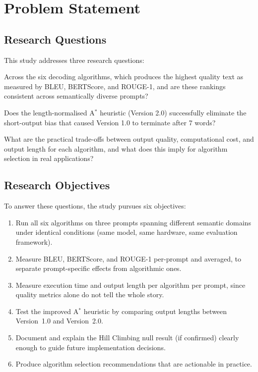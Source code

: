 \documentclass[12pt]{article}
\begin{document}
	\section{Problem Statement}
	\label{sec:problem}
	
	\subsection{Research Questions}
	
	This study addresses three research questions:
	
	\begin{description}[leftmargin=2cm, labelwidth=1.8cm]
		\item[RQ1] Across the six decoding algorithms, which produces the highest quality text as measured by BLEU, BERTScore, and ROUGE-1, and are these rankings consistent across semantically diverse prompts?
		
		\item[RQ2] Does the length-normalised A$^*$ heuristic (Version 2.0) successfully eliminate the short-output bias that caused Version 1.0 to terminate after 7 words?
		
		\item[RQ3] What are the practical trade-offs between output quality, computational cost, and output length for each algorithm, and what does this imply for algorithm selection in real applications?
	\end{description}
	
	\subsection{Research Objectives}
	
	To answer these questions, the study pursues six objectives:
	
	\begin{enumerate}[leftmargin=*]
		\item Run all six algorithms on three prompts spanning different semantic domains under identical conditions (same model, same hardware, same evaluation framework).
		\item Measure BLEU, BERTScore, and ROUGE-1 per-prompt and averaged, to separate prompt-specific effects from algorithmic ones.
		\item Measure execution time and output length per algorithm per prompt, since quality metrics alone do not tell the whole story.
		\item Test the improved A$^*$ heuristic by comparing output lengths between Version~1.0 and Version~2.0.
		\item Document and explain the Hill Climbing null result (if confirmed) clearly enough to guide future implementation decisions.
		\item Produce algorithm selection recommendations that are actionable in practice.
	\end{enumerate}
	
\end{document}
